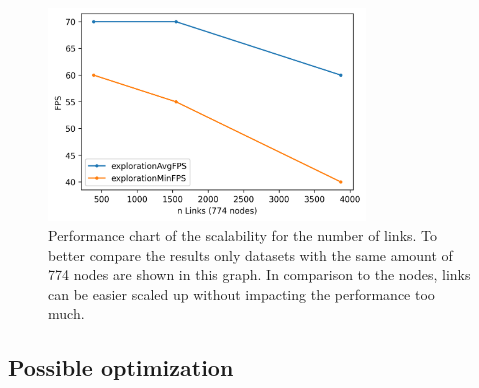 \begin{figure}[!hbt]
    \centering
    \includegraphics[width=0.75\textwidth]{graphics/performanceAnalysisLinks2.png}
    \caption[Performance chart of the scalability for the number of links.]{Performance chart of the scalability for the number of links. To better compare the results only datasets with the same amount of 774 nodes are shown in this graph. In comparison to the nodes, links can be easier scaled up without impacting the performance too much.} 
    \label{fig:performanceLinks} 
\end{figure}
\pagebreak
\subsection{Possible optimization}

